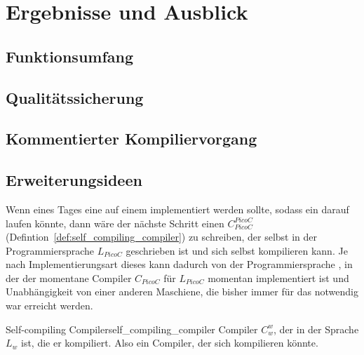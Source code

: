 \chapter{Ergebnisse und Ausblick}
\label{ch:ergebnisse_und_ausblick}


\section{Funktionsumfang}
\section{Qualitätssicherung}
\label{sec:qualitätssicherung}
\section{Kommentierter Kompiliervorgang}
\section{Erweiterungsideen}
Wenn eines Tages eine  auf einem  implementiert werden sollte, sodass ein  darauf laufen könnte, dann wäre der nächste Schritt einen  $C_{PicoC}^{PicoC}$ (Defintion~\ref{def:self_compiling_compiler}) zu schreiben, der selbst in der Programmiersprache $L_{PicoC}$ geschrieben ist und sich selbst kompilieren kann. Je nach Implementierungsart dieses  kann dadurch  von der Programmiersprache , in der der momentane Compiler $C_{PicoC}$ für $L_{PicoC}$ momentan implementiert ist und Unabhängigkeit von einer anderen Maschiene, die bisher immer für das  notwendig war erreicht werden.

\begin{Definition}{Self-compiling Compiler}{self_compiling_compiler}
  Compiler $C_w^w$, der in der Sprache $L_w$  ist, die er  kompiliert. Also ein Compiler, der sich  kompilieren könnte.
\end{Definition}

